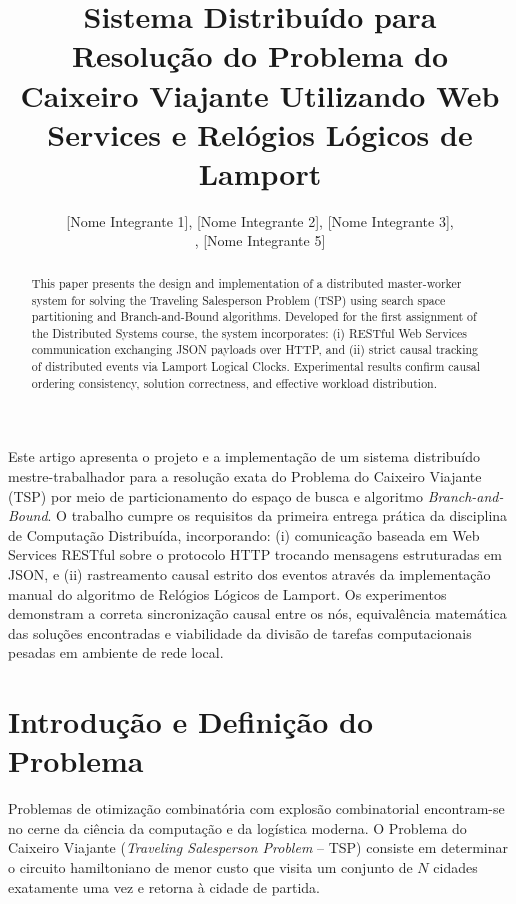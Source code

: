 \documentclass[12pt]{article}
\title{Sistema Distribuído para Resolução do Problema do Caixeiro Viajante Utilizando Web Services e Relógios Lógicos de Lamport}
\author{
  [Nome Integrante 1]\inst{1}, [Nome Integrante 2]\inst{1}, [Nome Integrante 3]\inst{1}, \\
  [Nome Integrante 4]\inst{1}, [Nome Integrante 5]\inst{1}
}
\begin{document}
\maketitle

\begin{resumo}
Este artigo apresenta o projeto e a implementação de um sistema distribuído mestre-trabalhador para a resolução exata do Problema do Caixeiro Viajante (TSP) por meio de particionamento do espaço de busca e algoritmo \textit{Branch-and-Bound}. O trabalho cumpre os requisitos da primeira entrega prática da disciplina de Computação Distribuída, incorporando: (i) comunicação baseada em Web Services RESTful sobre o protocolo HTTP trocando mensagens estruturadas em JSON, e (ii) rastreamento causal estrito dos eventos através da implementação manual do algoritmo de Relógios Lógicos de Lamport. Os experimentos demonstram a correta sincronização causal entre os nós, equivalência matemática das soluções encontradas e viabilidade da divisão de tarefas computacionais pesadas em ambiente de rede local.
\end{resumo}

\begin{abstract}
This paper presents the design and implementation of a distributed master-worker system for solving the Traveling Salesperson Problem (TSP) using search space partitioning and Branch-and-Bound algorithms. Developed for the first assignment of the Distributed Systems course, the system incorporates: (i) RESTful Web Services communication exchanging JSON payloads over HTTP, and (ii) strict causal tracking of distributed events via Lamport Logical Clocks. Experimental results confirm causal ordering consistency, solution correctness, and effective workload distribution.
\end{abstract}

\section{Introdução e Definição do Problema}
Problemas de otimização combinatória com explosão combinatorial encontram-se no cerne da ciência da computação e da logística moderna. O Problema do Caixeiro Viajante (\textit{Traveling Salesperson Problem} -- TSP) consiste em determinar o circuito hamiltoniano de menor custo que visita um conjunto de $N$ cidades exatamente uma vez e retorna à cidade de partida.
\end{document}

